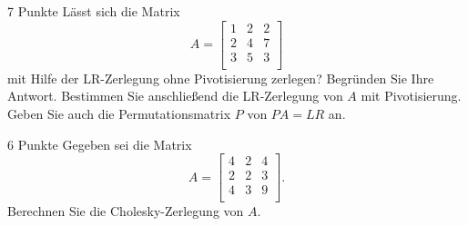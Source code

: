 \documentclass{problemset}
\author{Michael van Straten}
\begin{document}
\maketitle

\setcounter{problem}{3}

\begin{problem}{7 Punkte}
Lässt sich die Matrix
\[
    A =
    \begin{bmatrix}
        1 & 2 & 2 \\
        2 & 4 & 7 \\
        3 & 5 & 3 \\
    \end{bmatrix}
\]
mit Hilfe der LR-Zerlegung ohne Pivotisierung zerlegen? Begründen Sie Ihre
  Antwort. Bestimmen Sie anschließend die LR-Zerlegung von \(A\) mit
  Pivotisierung. Geben Sie auch die Permutationsmatrix \(P\) von \(PA = LR\)
  an.
\end{problem}

\begin{problem}{6 Punkte}
Gegeben sei die Matrix
\[
    A =
    \begin{bmatrix}
        4 & 2 & 4 \\
        2 & 2 & 3 \\
        4 & 3 & 9 \\
    \end{bmatrix}.
\]
Berechnen Sie die Cholesky-Zerlegung von \(A\).
\end{problem}
\end{document}
